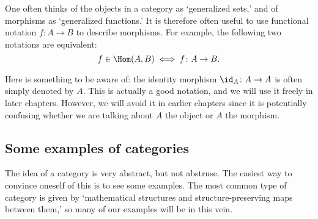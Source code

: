 \documentclass[main.tex]{subfiles}
\begin{document}
One often thinks of the objects in a category as `generalized sets,' and of morphisms as `generalized functions.' It is therefore often useful to use functional notation $f\colon A \to B$ to describe morphisms. For example, the following two notations are equivalent:
\begin{equation*}
  f \in \Hom(A, B) \iff f\colon A \to B.
\end{equation*}

Here is something to be aware of: the identity morphism $\id_{A}\colon A \to A$ is often simply denoted by $A$. This is actually a good notation, and we will use it freely in later chapters. However, we will avoid it in earlier chapters since it is potentially confusing whether we are talking about $A$ the object or $A$ the morphism.


\subsection{Some examples of categories}\label{sse:examples_of_categories}

The idea of a category is very abstract, but not abstruse. The easiest way to convince oneself of this is to see some examples. The most common type of category is given by `mathematical structures and structure-preserving maps between them,' so many of our examples will be in this vein.
\end{document}
